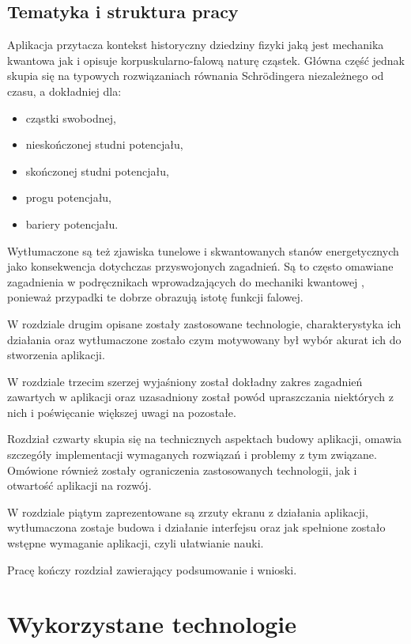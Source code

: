 \documentclass{SGGW-thesis}
\begin{document}
	\section{Tematyka i struktura pracy}
	Aplikacja przytacza kontekst historyczny dziedziny fizyki jaką jest mechanika kwantowa jak i opisuje korpuskularno-falową naturę cząstek. Główna część jednak skupia się na typowych rozwiązaniach równania Schrödingera niezależnego od czasu, a dokładniej dla:
	\begin{itemize}
	\item cząstki swobodnej,
	\item nieskończonej studni potencjału,
	\item skończonej studni potencjału,
	\item progu potencjału,
	\item bariery potencjału.
	\end{itemize}
	
	Wytłumaczone są też zjawiska tunelowe i skwantowanych stanów energetycznych jako konsekwencja dotychczas przyswojonych zagadnień. Są to często omawiane zagadnienia w podręcznikach wprowadzających do mechaniki kwantowej \cite{fiz atom} \cite{mechanika kwant} \cite{fiz kwant}, ponieważ przypadki te dobrze obrazują istotę funkcji falowej.
	
	W rozdziale drugim opisane zostały zastosowane technologie, charakterystyka ich działania oraz wytłumaczone zostało czym motywowany był wybór akurat ich do stworzenia aplikacji.
	
	W rozdziale trzecim szerzej wyjaśniony został dokładny zakres zagadnień zawartych w aplikacji oraz uzasadniony został powód upraszczania niektórych z nich i poświęcanie większej uwagi na pozostałe.
	
	Rozdział czwarty skupia się na technicznych aspektach budowy aplikacji, omawia szczegóły implementacji wymaganych rozwiązań i problemy z tym związane. Omówione również zostały ograniczenia zastosowanych technologii, jak i otwartość aplikacji na rozwój.
	
	W rozdziale piątym zaprezentowane są zrzuty ekranu z działania aplikacji, wytłumaczona zostaje budowa i działanie interfejsu oraz jak spełnione zostało wstępne wymaganie aplikacji, czyli ułatwianie nauki.
	
	Pracę kończy rozdział zawierający podsumowanie i wnioski.
	
	
\chapter{Wykorzystane technologie}
\end{document}
